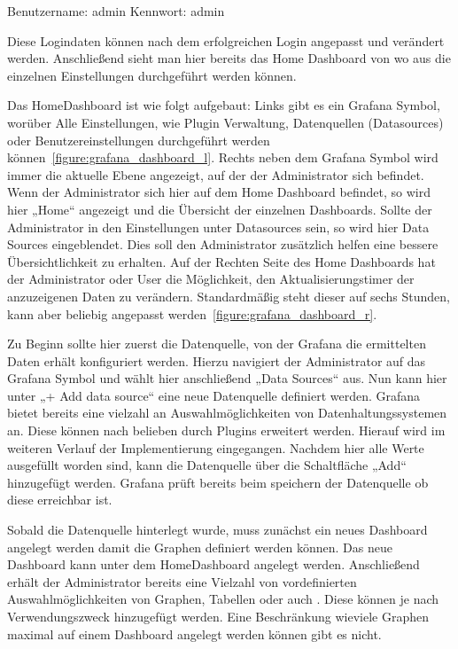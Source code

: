 \begin{outline}
  \1 Benutzername: admin
  \1 Kennwort: admin
\end{outline}

Diese Logindaten können nach dem erfolgreichen Login angepasst und verändert
werden. Anschließend sieht man hier bereits das Home Dashboard von wo aus die
einzelnen Einstellungen durchgeführt werden können.

Das HomeDashboard ist wie folgt aufgebaut: Links gibt es ein Grafana Symbol,
worüber Alle Einstellungen, wie Plugin Verwaltung, Datenquellen (Datasources)
oder Benutzereinstellungen durchgeführt werden
können~\ref{figure:grafana_dashboard_l}. Rechts neben dem Grafana Symbol wird
immer die aktuelle Ebene angezeigt, auf der der Administrator sich befindet.
Wenn der Administrator sich hier auf dem Home Dashboard befindet, so wird hier
„Home“ angezeigt und die Übersicht der einzelnen Dashboards. Sollte der
Administrator in den Einstellungen unter Datasources sein, so wird hier Data
Sources eingeblendet. Dies soll den Administrator zusätzlich helfen eine
bessere Übersichtlichkeit zu erhalten. Auf der Rechten Seite des Home
Dashboards hat der Administrator oder User die Möglichkeit, den
Aktualisierungstimer der anzuzeigenen Daten zu verändern. Standardmäßig steht
dieser auf sechs Stunden, kann aber beliebig angepasst
werden~\ref{figure:grafana_dashboard_r}.


Zu Beginn sollte hier zuerst die Datenquelle, von der Grafana die ermittelten
Daten erhält konfiguriert werden. Hierzu navigiert der Administrator auf das
Grafana Symbol und wählt hier anschließend „Data Sources“ aus. Nun kann hier
unter „+ Add data source“ eine neue Datenquelle definiert werden. Grafana
bietet bereits eine vielzahl an Auswahlmöglichkeiten von Datenhaltungssystemen
an. Diese können nach belieben durch Plugins erweitert werden. Hierauf wird im
weiteren Verlauf der Implementierung eingegangen. Nachdem hier alle Werte
ausgefüllt worden sind, kann die Datenquelle über die Schaltfläche „Add“
hinzugefügt werden. Grafana prüft bereits beim speichern der Datenquelle ob
diese erreichbar ist.

Sobald die Datenquelle hinterlegt wurde, muss zunächst ein neues Dashboard
angelegt werden damit die Graphen definiert werden können. Das neue Dashboard
kann unter dem HomeDashboard angelegt werden. Anschließend erhält der
Administrator bereits eine Vielzahl von vordefinierten Auswahlmöglichkeiten von
Graphen, Tabellen oder auch . Diese können je
nach Verwendungszweck hinzugefügt werden. Eine Beschränkung wieviele Graphen
maximal auf einem Dashboard angelegt werden können gibt es nicht.

